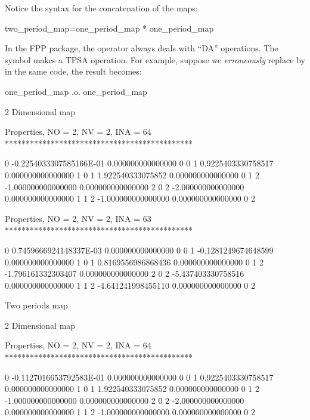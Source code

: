 \documentclass[english,12pt,article]{article} %
\begin{document}
{{{Notice the syntax for the  concatenation of the maps:
\begin{example}

             two_period_map=one_period_map * one_period_map
 
\end{example}

In the FPP package, the operator \vn{*}  always deals with ``DA'' operations.  The symbol  makes a TPSA operation. For example, suppose we {\it erroneously} replace  \vn{*} by in the same code, the result becomes:

\begin{example2}

 one_period_map .o. one_period_map
 
           2  Dimensional map

 Properties, NO =    2, NV =    2, INA =   64
 *********************************************

   0 -0.2254033307585166E-01   0.000000000000000       0  0
   1  0.9225403330758517       0.000000000000000       1  0
   1   1.922540333075852       0.000000000000000       0  1
   2  -1.000000000000000       0.000000000000000       2  0
   2  -2.000000000000000       0.000000000000000       1  1
   2  -1.000000000000000       0.000000000000000       0  2


 Properties, NO =    2, NV =    2, INA =   63
 *********************************************

   0  0.7459666924148337E-03   0.000000000000000       0  0
   1 -0.1281249674648599       0.000000000000000       1  0
   1  0.8169556986868436       0.000000000000000       0  1
   2  -1.796161332303407       0.000000000000000       2  0
   2  -5.437403330758516       0.000000000000000       1  1
   2  -4.641241998455110       0.000000000000000       0  2

  
  Two periods map

           2  Dimensional map

 Properties, NO =    2, NV =    2, INA =   64
 *********************************************

   0 -0.1127016653792583E-01   0.000000000000000       0  0
   1  0.9225403330758517       0.000000000000000       1  0
   1   1.922540333075852       0.000000000000000       0  1
   2  -1.000000000000000       0.000000000000000       2  0
   2  -2.000000000000000       0.000000000000000       1  1
   2  -1.000000000000000       0.000000000000000       0  2



\end{example2}}}}
\end{document}
